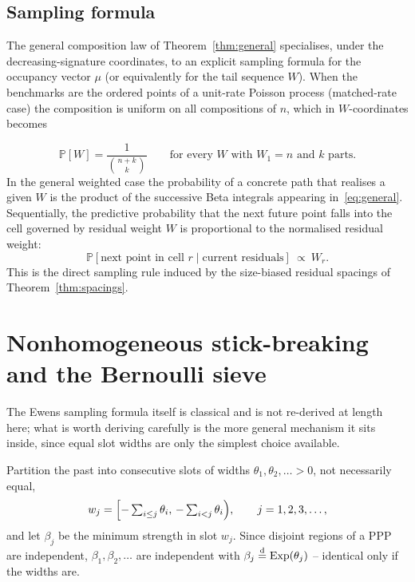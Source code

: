 \documentclass[11pt]{article}
\newcommand{\PP}{\mathbb{P}}
\DeclareMathOperator{\Exp}{Exp}
\theoremstyle{plain}
\theoremstyle{definition}
\begin{document}
\subsection{Sampling formula}

The general composition law of Theorem~\ref{thm:general} specialises, under the decreasing-signature coordinates, to an explicit sampling formula for the occupancy vector \(\mu\) (or equivalently for the tail sequence \(W\)). When the benchmarks are the ordered points of a unit-rate Poisson process (matched-rate case) the composition is uniform on all compositions of \(n\), which in \(W\)-coordinates becomes



\[
\PP[W]=\frac1{\binom{n+k}{k}}\qquad\text{for every }W\text{ with }W_1=n\text{ and  }k\text{ parts}.
\]
In the general weighted case the probability of a concrete path that realises a given \(W\) is the product of the successive Beta integrals appearing in~\eqref{eq:general}. Sequentially, the predictive probability that the next future point falls into the cell governed by residual weight \(W\) is proportional to the normalised residual weight:
\[
\PP[\text{next point in cell }r\mid\text{current residuals}]\ \propto\ W_r.
\]
This is the direct sampling rule induced by the size-biased residual spacings of Theorem~\ref{thm:spacings}.

\section{Nonhomogeneous stick-breaking and the Bernoulli sieve}
\label{sec:ewens}

The Ewens sampling formula itself is classical and is not re-derived at length here; what is worth deriving carefully is the more general mechanism it sits inside, since equal slot widths are only the simplest choice available.

Partition the past into consecutive slots of widths \(\theta_1,\theta_2,\dots>0\), not necessarily equal,
\[
w_j=\Bigl[-\textstyle\sum_{i\le j}\theta_i,\,-\sum_{i<j}\theta_i\Bigr),\qquad j=1,2,3,\dots,
\]
and let \(\beta_j\) be the minimum strength in slot \(w_j\). Since disjoint regions of a PPP are independent, \(\beta_1,\beta_2,\dots\) are independent with \(\beta_j\stackrel{\rm d}{=}\Exp(\theta_j)\) -- identical only if the widths are.
\end{document}
